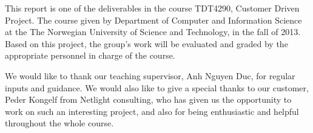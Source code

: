 This report is one of the deliverables in the course TDT4290, Customer Driven Project. The course given by Department of Computer and Information Science at the The Norwegian University of Science and Technology, in the fall of 2013. Based on this project, the group's work will be evaluated and graded by the appropriate personnel in charge of the course. 

We would like to thank our teaching supervisor, Anh Nguyen Duc, for regular inputs and guidance. 
We would also like to give a special thanks to our customer, Peder  Kongelf from  Netlight consulting, who has given us the opportunity to work on such an interesting project, and also for being enthusiastic and helpful throughout the whole course.